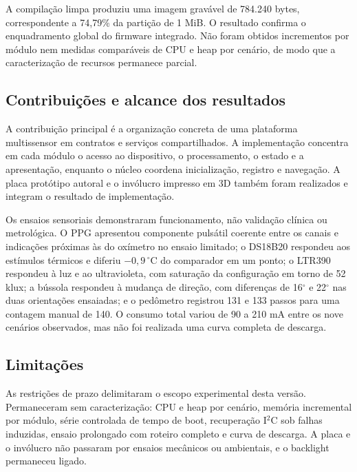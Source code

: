 \documentclass[a4paper,12pt]{article}
\begin{document}
A compila\c{c}\~ao limpa produziu uma imagem grav\'avel de 784.240 bytes, correspondente a 74,79\% da parti\c{c}\~ao de 1 MiB. O resultado confirma o enquadramento global do firmware integrado. N\~ao foram obtidos incrementos por m\'odulo nem medidas compar\'aveis de CPU e heap por cen\'ario, de modo que a caracteriza\c{c}\~ao de recursos permanece parcial.


\subsection{Contribui\c{c}\~oes e alcance dos resultados}


A contribui\c{c}\~ao principal \'e a organiza\c{c}\~ao concreta de uma plataforma multissensor em contratos e servi\c{c}os compartilhados. A implementa\c{c}\~ao concentra em cada m\'odulo o acesso ao dispositivo, o processamento, o estado e a apresenta\c{c}\~ao, enquanto o n\'ucleo coordena inicializa\c{c}\~ao, registro e navega\c{c}\~ao. A placa prot\'otipo autoral e o inv\'olucro impresso em 3D tamb\'em foram realizados e integram o resultado de implementa\c{c}\~ao.


Os ensaios sensoriais demonstraram funcionamento, n\~ao valida\c{c}\~ao cl\'inica ou metrol\'ogica. O PPG apresentou componente puls\'atil coerente entre os canais e indica\c{c}\~oes pr\'oximas \`as do ox\'imetro no ensaio limitado; o DS18B20 respondeu aos est\'imulos t\'ermicos e diferiu $-0{,}9\,^\circ$C do comparador em um ponto; o LTR390 respondeu \`a luz e ao ultravioleta, com satura\c{c}\~ao da configura\c{c}\~ao em torno de 52 klux; a b\'ussola respondeu \`a mudan\c{c}a de dire\c{c}\~ao, com diferen\c{c}as de 16$^\circ$ e 22$^\circ$ nas duas orienta\c{c}\~oes ensaiadas; e o ped\^ometro registrou 131 e 133 passos para uma contagem manual de 140. O consumo total variou de 90 a 210 mA entre os nove cen\'arios observados, mas n\~ao foi realizada uma curva completa de descarga.


\subsection{Limita\c{c}\~oes}


As restri\c{c}\~oes de prazo delimitaram o escopo experimental desta vers\~ao. Permaneceram sem caracteriza\c{c}\~ao: CPU e heap por cen\'ario, mem\'oria incremental por m\'odulo, s\'erie controlada de tempo de boot, recupera\c{c}\~ao I$^2$C sob falhas induzidas, ensaio prolongado com roteiro completo e curva de descarga. A placa e o inv\'olucro n\~ao passaram por ensaios mec\^anicos ou ambientais, e o backlight permaneceu ligado.
\end{document}

